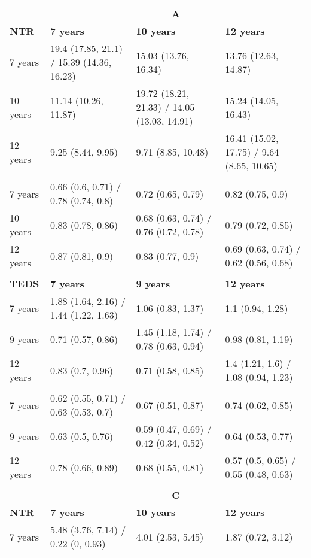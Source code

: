 \begin{tabular}{llll}
  \toprule
      & \multicolumn{3}{c}{\textbf{A}} \\
\cmidrule{2-4} \textbf{NTR} & \textbf{7 years} & \textbf{10 years} & \textbf{12 years} \\
\midrule
7 years & 19.4 (17.85, 21.1) / 15.39 (14.36, 16.23) & 15.03 (13.76, 16.34) & 13.76 (12.63, 14.87) \\
10 years & 11.14 (10.26, 11.87) & 19.72 (18.21, 21.33) / 14.05 (13.03, 14.91) & 15.24 (14.05, 16.43) \\
12 years & 9.25 (8.44, 9.95) & 9.71 (8.85, 10.48) & 16.41 (15.02, 17.75) / 9.64 (8.65, 10.65) \\
      &       &       &  \\
7 years & 0.66 (0.6, 0.71) / 0.78 (0.74, 0.8) & 0.72 (0.65, 0.79) & 0.82 (0.75, 0.9) \\
10 years & 0.83 (0.78, 0.86) & 0.68 (0.63, 0.74) / 0.76 (0.72, 0.78) & 0.79 (0.72, 0.85) \\
12 years & 0.87 (0.81, 0.9) & 0.83 (0.77, 0.9) & 0.69 (0.63, 0.74) / 0.62 (0.56, 0.68) \\
      &       &       &  \\
\cmidrule{2-4}\textbf{TEDS} & \textbf{7 years} & \textbf{9 years} & \textbf{12 years} \\
      \midrule
7 years & 1.88 (1.64, 2.16) / 1.44 (1.22, 1.63) & 1.06 (0.83, 1.37) & 1.1 (0.94, 1.28) \\
9 years & 0.71 (0.57, 0.86) & 1.45 (1.18, 1.74) / 0.78 (0.63, 0.94) & 0.98 (0.81, 1.19) \\
12 years & 0.83 (0.7, 0.96) & 0.71 (0.58, 0.85) & 1.4 (1.21, 1.6) / 1.08 (0.94, 1.23) \\
      &       &       &  \\
7 years & 0.62 (0.55, 0.71) / 0.63 (0.53, 0.7) & 0.67 (0.51, 0.87) & 0.74 (0.62, 0.85) \\
9 years & 0.63 (0.5, 0.76) & 0.59 (0.47, 0.69) / 0.42 (0.34, 0.52) & 0.64 (0.53, 0.77) \\
12 years & 0.78 (0.66, 0.89) & 0.68 (0.55, 0.81) & 0.57 (0.5, 0.65) / 0.55 (0.48, 0.63) \\
      &       &       &  \\
      \midrule
      & \multicolumn{3}{c}{\textbf{C}} \\
\cmidrule{2-4} \textbf{NTR} & \textbf{7 years} & \textbf{10 years} & \textbf{12 years} \\
      \midrule
7 years & 5.48 (3.76, 7.14) / 0.22 (0, 0.93) & 4.01 (2.53, 5.45) & 1.87 (0.72, 3.12) \\

\end{tabular}
